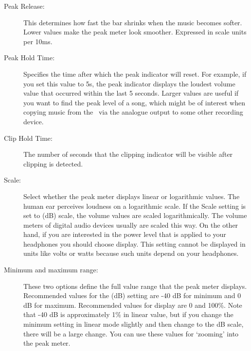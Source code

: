 \begin{description}
{      \begin{description}
      \item[Peak Release:]
        This determines how fast the bar shrinks when the music becomes
        softer. Lower values make the peak meter look smoother.
        Expressed in scale units per 10ms.
      \item[Peak Hold Time:]
        Specifies the time after which the peak indicator will reset.
        For example, if you set this value to 5s, the peak indicator displays
        the loudest volume value that occurred within the last 5 seconds.
        Larger values are useful if you want to find the peak level of a song,
        which might be of interest when copying music from the \dap\ via the
        analogue output to some other recording device.
      \item[Clip Hold Time:]
        The number of seconds that the clipping indicator will be visible
        after clipping is detected.
      \item[\label{ref:Peakmetersetting}Scale:]
        Select whether the peak meter displays linear or logarithmic values.
        The human ear perceives loudness on a logarithmic scale. If the Scale
        setting is set to  (dB) scale, the volume values
        are scaled logarithmically. The volume meters of digital audio
        devices usually are scaled this way. On the other hand, if you
        are interested in the power level that is applied to your headphones
        you should choose  display. This setting cannot be
        displayed in units like volts or watts because such units depend
        on your headphones.
      \item[Minimum and maximum range:]
        These two options define the full value range that the peak meter
        displays. Recommended values for the  (dB) setting
        are {}-40 dB for minimum and 0 dB for maximum. Recommended values
        for  display are 0 and 100\%. Note that {}-40 dB is
        approximately 1\% in linear value, but if you change the minimum
        setting in linear mode slightly and then change to the dB scale,
        there will be a large change. You can use these values for `zooming'
        into the peak meter.
      \end{description}
}
\end{description}
